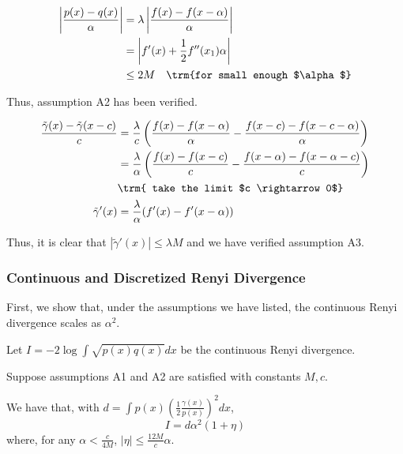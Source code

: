 \documentclass{article}
\begin{document}
\begin{example}
\begin{align*}
\left| \frac{ p(x) - q(x)}{\alpha} \right| &= \lambda \left| \frac{f(x) - f(x-\alpha)}{\alpha} \right| \\
 &= \left| f'(x) + \frac{1}{2} f''(x_1) \alpha \right| \\
 &\leq 2M  \quad \trm{for small enough $\alpha$}
\end{align*}

Thus, assumption A2 has been verified. 

\begin{align*}
\frac{ \tilde{\gamma}(x) - \tilde{\gamma}(x - c) }{c} &= 
 \frac{\lambda}{c} \left(   \frac{f(x) - f(x-\alpha)}{\alpha} - \frac{f(x-c) - f(x-c - \alpha)}{\alpha}  \right) \\
  &= \frac{\lambda}{\alpha} \left( \frac{f(x) - f(x-c)}{c} - 
                  \frac{ f(x-\alpha) - f(x - \alpha - c)}{c} \right) \\
 &\trm{ take the limit $c \rightarrow 0$} \\
\tilde{\gamma}'(x) &= \frac{\lambda}{\alpha} (f'(x) - f'(x-\alpha) ) 
\end{align*}

Thus, it is clear that $ | \tilde{\gamma}'(x) | \leq \lambda M$ and we have verified assumption A3. 

\end{example}

\subsubsection{Continuous and Discretized Renyi Divergence}

First, we show that, under the assumptions we have listed, the continuous Renyi divergence scales as $\alpha^2$. 

\begin{proposition}
\label{prop:continuous_renyi_order}
Let $I = -2 \log \int \sqrt{p(x)q(x)} dx$ be the continuous Renyi divergence.

Suppose assumptions A1 and A2 are satisfied with constants $M, c$. 

We have that, with $d = \int p(x) \left( \frac{1}{2} \frac{\gamma(x)}{p(x)} \right)^2 dx$,
\[
I = d \alpha^2 ( 1 + \eta )
\]
where, for any $\alpha < \frac{c}{4M}$, $|\eta| \leq \frac{12 M}{c} \alpha$. 

\end{proposition}
\end{document}
